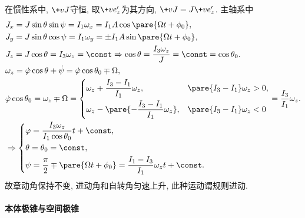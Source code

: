 \documentclass[../LectureNotes.tex]{subfiles}
\begin{document}
\begin{figure}[ht]
    \centering
    \caption{}
\end{figure}
在惯性系中, $\+vJ$守恒, 取$\+ve'_z$为其方向, $\+vJ = J\+ve'_z$. 主轴系中
\begin{align*}
    & J_x = J \sin\theta\sin\psi = I_1\omega_x = I_1 A\cos\pare{\Omega t + \phi_0}, \\
    & J_y = J\sin\theta\cos\psi = I_1\omega_y = \pm I_1 A\sin\pare{\Omega t + \phi_0}, \\
    & J_z = J\cos\theta = I_3\omega_z = \const \Rightarrow \cos\theta = \frac{I_3\omega_z}{J} = \const = \cos\theta_0. \\
    & \omega_z = \dot\varphi\cos\theta+\dot\psi = \dot\varphi\cos\theta_0 \mp \Omega, \\
    & \dot\varphi \cos\theta_0 = \omega_z \mp\Omega = \left\{ \begin{aligned}
        &\omega_z + \frac{I_3-I_1}{I_1}\omega_z, && \pare{I_3 - I_1}\omega_z > 0, \\
        &\omega_z - \pare{-\frac{I_3-I_1}{I_1}\omega_z}, && \pare{I_3-I_1}\omega_z < 0
    \end{aligned} \right. = \frac{I_3}{I_1}\omega_z. \\
    & \Rightarrow \left\{ \begin{aligned}
        & \varphi = \frac{I_3\omega_z}{I_1\cos\theta_0} t + \const, \\
        & \theta = \theta_0 = \const, \\
        & \psi = \frac{\pi}{2} \mp \pare{\Omega t + \phi_0} = \frac{I_1-I_3}{I_1}\omega_z t + \const.
    \end{aligned} \right.
\end{align*}
故章动角保持不变, 进动角和自转角匀速上升, 此种运动谓规则进动.

\paragraph{本体极锥与空间极锥} %
\label{par:本体极锥与空间极锥}
\end{document}

